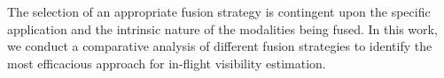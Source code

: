 The selection of an appropriate fusion strategy is contingent upon the specific application and the intrinsic nature of the modalities being fused. In this work, we conduct a comparative analysis of different fusion strategies to identify the most efficacious approach for in-flight visibility estimation.
